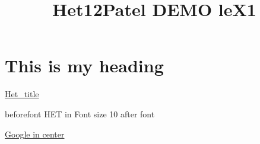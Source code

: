 \documentclass{article}
\title{Het12Patel DEMO leX1}
\begin{document}
\maketitle
\section{This is my heading}
\href{http://www.het.com}{Het\_title}

\par
beforefont
{\fontsize{11}{13}\selectfont HET in Font size 10}
after font
\newline
\newline

\centerline{\href{http://www.google.com}{Google in center}
}
\end{document}
